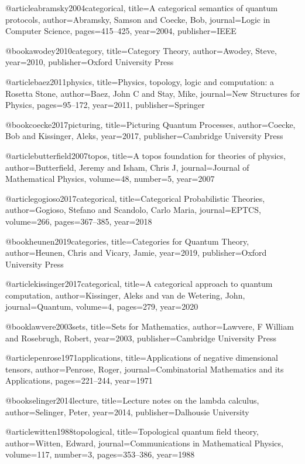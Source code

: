 @article{abramsky2004categorical,
  title={A categorical semantics of quantum protocols},
  author={Abramsky, Samson and Coecke, Bob},
  journal={Logic in Computer Science},
  pages={415--425},
  year={2004},
  publisher={IEEE}
}

@book{awodey2010category,
  title={Category Theory},
  author={Awodey, Steve},
  year={2010},
  publisher={Oxford University Press}
}

@article{baez2011physics,
  title={Physics, topology, logic and computation: a {R}osetta {S}tone},
  author={Baez, John C and Stay, Mike},
  journal={New Structures for Physics},
  pages={95--172},
  year={2011},
  publisher={Springer}
}

@book{coecke2017picturing,
  title={Picturing Quantum Processes},
  author={Coecke, Bob and Kissinger, Aleks},
  year={2017},
  publisher={Cambridge University Press}
}

@article{butterfield2007topos,
  title={A topos foundation for theories of physics},
  author={Butterfield, Jeremy and Isham, Chris J},
  journal={Journal of Mathematical Physics},
  volume={48},
  number={5},
  year={2007}
}

@article{gogioso2017categorical,
  title={Categorical Probabilistic Theories},
  author={Gogioso, Stefano and Scandolo, Carlo Maria},
  journal={EPTCS},
  volume={266},
  pages={367--385},
  year={2018}
}

@book{heunen2019categories,
  title={Categories for Quantum Theory},
  author={Heunen, Chris and Vicary, Jamie},
  year={2019},
  publisher={Oxford University Press}
}

@article{kissinger2017categorical,
  title={A categorical approach to quantum computation},
  author={Kissinger, Aleks and van de Wetering, John},
  journal={Quantum},
  volume={4},
  pages={279},
  year={2020}
}

@book{lawvere2003sets,
  title={Sets for Mathematics},
  author={Lawvere, F William and Rosebrugh, Robert},
  year={2003},
  publisher={Cambridge University Press}
}

@article{penrose1971applications,
  title={Applications of negative dimensional tensors},
  author={Penrose, Roger},
  journal={Combinatorial Mathematics and its Applications},
  pages={221--244},
  year={1971}
}

@book{selinger2014lecture,
  title={Lecture notes on the lambda calculus},
  author={Selinger, Peter},
  year={2014},
  publisher={Dalhousie University}
}

@article{witten1988topological,
  title={Topological quantum field theory},
  author={Witten, Edward},
  journal={Communications in Mathematical Physics},
  volume={117},
  number={3},
  pages={353--386},
  year={1988}
}


